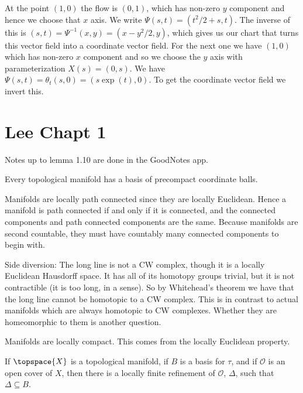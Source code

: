     \begin{solution}
        At the point $(1,0)$ the flow is $(0,1)$, which has non-zero $y$
        component and hence we choose that $x$ axis. We write
        $\Psi(s,t)=(t^{2}/2+s,t)$. The inverse of this is
        $(s,t)=\Psi^{\minus{1}}(x,y)=(x-y^{2}/2,y)$, which gives us our
        chart that turns this vector field into a coordinate vector field.
        For the next one we have $(1,0)$ which has non-zero $x$ component
        and so we choose the $y$ axis with parameterization $X(s)=(0,s)$.
        We have $\Psi(s,t)=\theta_{t}(s,0)=(s\exp(t),0)$. To get the
        coordinate vector field we invert this.
    \end{solution}
\section{Lee Chapt 1}
    Notes up to lemma 1.10 are done in the GoodNotes app.
    \begin{theorem}
        Every topological manifold has a basis of precompact coordinate balls.
    \end{theorem}
    Manifolds are locally path connected since they are locally Euclidean. Hence
    a manifold is path connected if and only if it is connected, and the
    connected components and path connected components are the same. Because
    manifolds are second countable, they must have countably many connected
    components to begin with.
    \par\hfill\par
    Side diversion: The long line is not a CW complex, though it is a locally
    Euclidean Hausdorff space. It has all of its homotopy groups trivial, but
    it is not contractible (it is too long, in a sense). So by Whitehead's
    theorem we have that the long line cannot be homotopic to a CW complex. This
    is in contrast to actual manifolds which are always homotopic to CW
    complexes. Whether they are homeomorphic to them is another question.
    \par\hfill\par
    Manifolds are locally compact. This comes from the locally Euclidean
    property.
    \begin{theorem}
        If $\topspace{X}$ is a topological manifold, if $B$ is a basis for
        $\tau$, and if $\mathcal{O}$ is an open cover of $X$, then there is a
        locally finite refinement of $\mathcal{O}$, $\Delta$, such that
        $\Delta\subseteq{B}$.
    \end{theorem}
